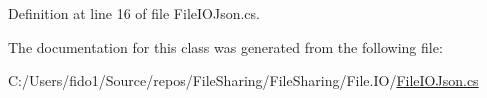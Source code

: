 Definition at line 16 of file File\+I\+O\+Json.\+cs.



The documentation for this class was generated from the following file\+:\begin{DoxyCompactItemize}
\item 
C\+:/\+Users/fido1/\+Source/repos/\+File\+Sharing/\+File\+Sharing/\+File.\+I\+O/\hyperlink{_file_i_o_json_8cs}{File\+I\+O\+Json.\+cs}\end{DoxyCompactItemize}
